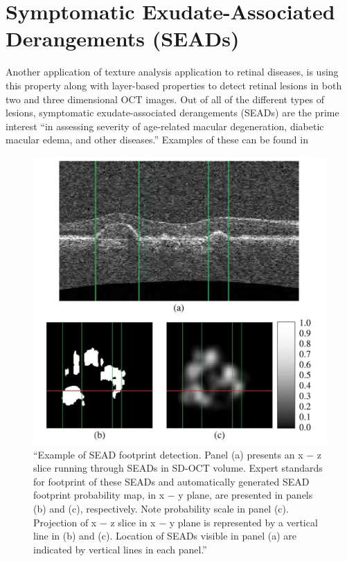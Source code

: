 \section{Symptomatic Exudate-Associated Derangements (SEADs)}
Another application of texture analysis application to retinal diseases, is using this
property along with layer-based properties to detect retinal lesions in both two and
three dimensional OCT images. Out of all of the different types of lesions, symptomatic
exudate-associated derangements (SEADs) are the prime interest “in assessing severity
of age-related macular degeneration, diabetic macular edema, and other diseases.”
\cite{mbib_4} Examples of these can be found in 

\begin{figure}[htbp]
\centering
 \includegraphics{figures/morgan_7}
\caption{“Example of SEAD footprint detection. Panel (a) presents an x − z slice running through SEADs in SD-OCT volume. Expert standards for footprint of these SEADs and automatically generated SEAD footprint probability map, in x − y plane, are presented in panels (b) and (c), respectively. Note probability scale in panel (c). Projection of x − z slice in x − y plane is represented by a vertical line in (b) and (c). Location of SEADs visible in panel (a) are indicated by vertical lines in each panel.” \cite{mbib_4} }
\label{fig:m_7}
\end{figure}

